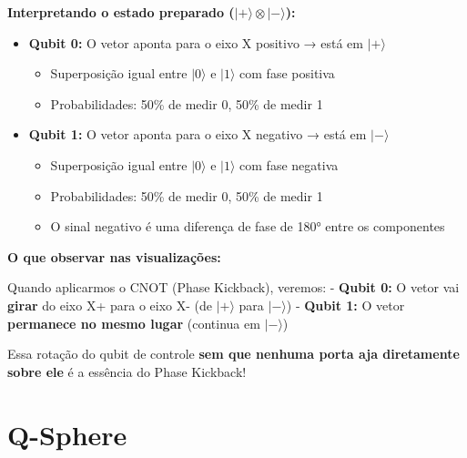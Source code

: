 \documentclass[
  brazilian,
]{report}
\providecommand{\tightlist}{%
  \setlength{\itemsep}{0pt}\setlength{\parskip}{0pt}}
\begin{document}
\textbf{Interpretando o estado preparado
(\(|+\rangle \otimes |-\rangle\)):}

\begin{itemize}
\tightlist
\item
  \textbf{Qubit 0:} O vetor aponta para o eixo X positivo → está em
  \(|+\rangle\)

  \begin{itemize}
  \tightlist
  \item
    Superposição igual entre \(|0\rangle\) e \(|1\rangle\) com fase
    positiva
  \item
    Probabilidades: 50\% de medir 0, 50\% de medir 1
  \end{itemize}
\item
  \textbf{Qubit 1:} O vetor aponta para o eixo X negativo → está em
  \(|-\rangle\)

  \begin{itemize}
  \tightlist
  \item
    Superposição igual entre \(|0\rangle\) e \(|1\rangle\) com fase
    negativa
  \item
    Probabilidades: 50\% de medir 0, 50\% de medir 1
  \item
    O sinal negativo é uma diferença de fase de 180° entre os
    componentes
  \end{itemize}
\end{itemize}

\textbf{O que observar nas visualizações:}

Quando aplicarmos o CNOT (Phase Kickback), veremos: - \textbf{Qubit 0:}
O vetor vai \textbf{girar} do eixo X+ para o eixo X- (de \(|+\rangle\)
para \(|-\rangle\)) - \textbf{Qubit 1:} O vetor \textbf{permanece no
mesmo lugar} (continua em \(|-\rangle\))

Essa rotação do qubit de controle \textbf{sem que nenhuma porta aja
diretamente sobre ele} é a essência do Phase Kickback!

\section{Q-Sphere}\label{q-sphere}
\end{document}
